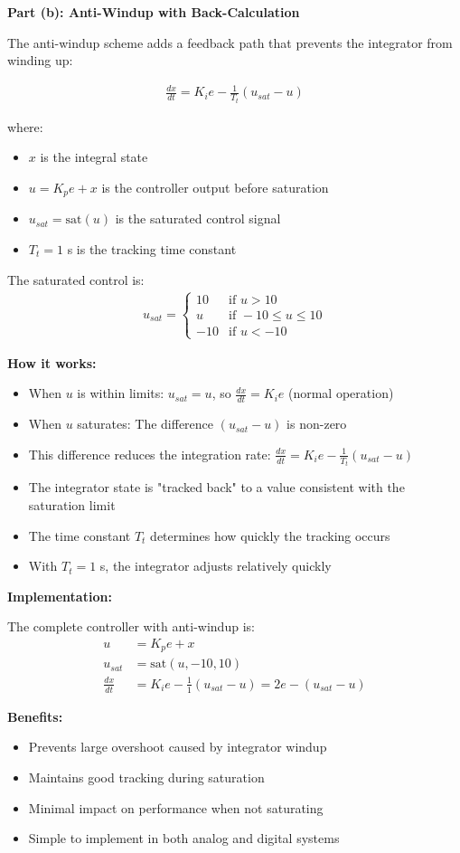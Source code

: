 \documentclass[11pt,a4paper]{article}
\begin{document}
\textbf{Part (b): Anti-Windup with Back-Calculation}

The anti-windup scheme adds a feedback path that prevents the integrator from winding up:

\begin{align}
  \frac{dx}{dt} = K_i e - \frac{1}{T_t}(u_{sat} - u)
\end{align}

where:
\begin{itemize}
  \item $x$ is the integral state
  \item $u = K_p e + x$ is the controller output before saturation
  \item $u_{sat} = \text{sat}(u)$ is the saturated control signal
  \item $T_t = 1$ s is the tracking time constant
\end{itemize}

The saturated control is:
\begin{align}
  u_{sat} = \begin{cases}
    10 & \text{if } u > 10 \\
    u & \text{if } -10 \leq u \leq 10 \\
    -10 & \text{if } u < -10
  \end{cases}
\end{align}

\textbf{How it works:}

\begin{itemize}
  \item When $u$ is within limits: $u_{sat} = u$, so $\frac{dx}{dt} = K_i e$ (normal operation)
  \item When $u$ saturates: The difference $(u_{sat} - u)$ is non-zero
  \item This difference reduces the integration rate: $\frac{dx}{dt} = K_i e - \frac{1}{T_t}(u_{sat} - u)$
  \item The integrator state is "tracked back" to a value consistent with the saturation limit
  \item The time constant $T_t$ determines how quickly the tracking occurs
  \item With $T_t = 1$ s, the integrator adjusts relatively quickly
\end{itemize}

\textbf{Implementation:}

The complete controller with anti-windup is:
\begin{align}
  u &= K_p e + x \\
  u_{sat} &= \text{sat}(u, -10, 10) \\
  \frac{dx}{dt} &= K_i e - \frac{1}{1}(u_{sat} - u) = 2e - (u_{sat} - u)
\end{align}

\textbf{Benefits:}
\begin{itemize}
  \item Prevents large overshoot caused by integrator windup
  \item Maintains good tracking during saturation
  \item Minimal impact on performance when not saturating
  \item Simple to implement in both analog and digital systems
\end{itemize}
\end{document}
